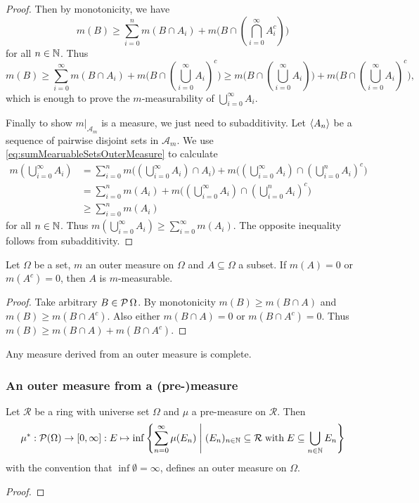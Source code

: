 \begin{proof}
Then by monotonicity, we have
\[ m(B) \geq \sum_{i=0}^nm(B\cap A_i) + m\big(B\cap (\bigcap_{i=0}^\infty A_i^c)\big) \]
for all $n\in \mathbb{N}$. Thus
\[ m(B) \geq \sum_{i=0}^\infty m(B\cap A_i) + m\big(B\cap (\bigcup_{i=0}^\infty A_i)^c\big) \geq m\big(B\cap (\bigcup_{i=0}^\infty A_i)\big) + m\big(B\cap (\bigcup_{i=0}^\infty A_i)^c\big), \]
which is enough to prove the $m$-measurability of $\bigcup_{i=0}^\infty A_i$.

Finally to show $m|_{\mathcal{A}_m}$ is a measure, we just need to subadditivity. Let $\left\langle A_n \right\rangle$ be a sequence of pairwise disjoint sets in $\mathcal{A}_m$. We use \eqref{eq:sumMearuableSetsOuterMeasure} to calculate
\begin{align*}
m(\bigcup_{i=0}^\infty A_i) &= \sum_{i=0}^nm\big((\bigcup_{i=0}^\infty A_i)\cap A_i\big) + m\big((\bigcup_{i=0}^\infty A_i)\cap (\bigcup_{i=0}^nA_i)^c\big) \\
&= \sum_{i=0}^nm(A_i) + m\big((\bigcup_{i=0}^\infty A_i)\cap (\bigcup_{i=0}^nA_i)^c\big) \\
&\geq \sum_{i=0}^nm(A_i)
\end{align*}
for all $n\in \mathbb{N}$. Thus $m(\bigcup_{i=0}^\infty A_i) \geq \sum_{i=0}^\infty m(A_i)$. The opposite inequality follows from subadditivity.
\end{proof}


\begin{lemma}
Let $\Omega$ be a set, $m$ an outer measure on $\Omega$ and $A\subseteq \Omega$ a subset. If $m(A) = 0$ or $m(A^c) = 0$, then $A$ is $m$-measurable.
\end{lemma}
\begin{proof}
Take arbitrary $B\in\operatorname{\mathcal{P}}{\Omega}$. By monotonicity $m(B) \geq m(B\cap A)$ and $m(B) \geq m(B\cap A^c)$. Also either $m(B\cap A) = 0$ or $m(B\cap A^c) = 0$. Thus $m(B) \geq m(B\cap A) + m(B\cap A^c)$.
\end{proof}
\begin{corollary}
Any measure derived from an outer measure is complete.
\end{corollary}

\subsubsection{An outer measure from a (pre-)measure}
\begin{proposition}
Let $\mathcal{R}$ be a ring with universe set $\Omega$ and $\mu$ a pre-measure on $\mathcal{R}$. Then
\[ \mu^*: \operatorname{\mathcal{P}}(\Omega)\to [0,\infty]: E\mapsto \inf\left\{ \sum^\infty_{n=0}\mu(E_n) \;\middle|\; (E_n)_{n\in\mathbb{N}}\subseteq \mathcal{R}\;\text{with}\;E\subseteq \bigcup_{n\in\mathbb{N}}E_n \right\} \]
with the convention that $\inf\emptyset = \infty$, defines an outer measure on $\Omega$.
\end{proposition}
\begin{proof}

\end{proof}

